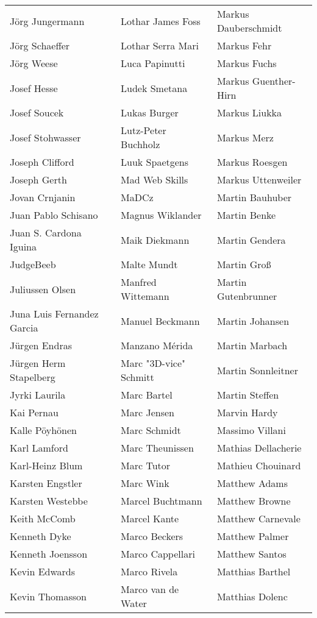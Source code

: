 \begin{small}
\begin{tabular}{p{4cm}p{4cm}p{4cm}}
Jörg Jungermann & Lothar James Foss & Markus Dauberschmidt \\
Jörg Schaeffer & Lothar Serra Mari & Markus Fehr \\
Jörg Weese & Luca Papinutti & Markus Fuchs \\
Josef Hesse & Ludek Smetana & Markus Guenther-Hirn \\
Josef Soucek & Lukas Burger & Markus Liukka \\
Josef Stohwasser & Lutz-Peter Buchholz & Markus Merz \\
Joseph Clifford & Luuk Spaetgens & Markus Roesgen \\
Joseph Gerth & Mad Web Skills & Markus Uttenweiler \\
Jovan Crnjanin & MaDCz & Martin Bauhuber \\
Juan Pablo Schisano & Magnus Wiklander & Martin Benke \\
Juan S. Cardona Iguina & Maik Diekmann & Martin Gendera \\
JudgeBeeb & Malte Mundt & Martin Groß \\
Juliussen Olsen & Manfred Wittemann & Martin Gutenbrunner \\
Juna Luis Fernandez Garcia & Manuel Beckmann & Martin Johansen \\
Jürgen Endras & Manzano Mérida & Martin Marbach \\
Jürgen Herm Stapelberg & Marc "3D-vice" Schmitt & Martin Sonnleitner \\
Jyrki Laurila & Marc Bartel & Martin Steffen \\
Kai Pernau & Marc Jensen & Marvin Hardy \\
Kalle Pöyhönen & Marc Schmidt & Massimo Villani \\
Karl Lamford & Marc Theunissen & Mathias Dellacherie \\
Karl-Heinz Blum & Marc Tutor & Mathieu Chouinard \\
Karsten Engstler & Marc Wink & Matthew Adams \\
Karsten Westebbe & Marcel Buchtmann & Matthew Browne \\
Keith McComb & Marcel Kante & Matthew Carnevale \\
Kenneth Dyke & Marco Beckers & Matthew Palmer \\
Kenneth Joensson & Marco Cappellari & Matthew Santos \\
Kevin Edwards & Marco Rivela & Matthias Barthel \\
Kevin Thomasson & Marco van de Water & Matthias Dolenc \\

\end{tabular}
\end{small}
